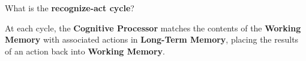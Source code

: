 \begin{flashcard}[Question]{What is the \textbf{recognize-act cycle}?}
\begin{center}
At each cycle, the \textbf{Cognitive Processor} matches the contents of the \textbf{Working Memory} with associated actions in \textbf{Long-Term Memory}, placing the results of an action back into \textbf{Working Memory}.
\end{center}
\end{flashcard}
